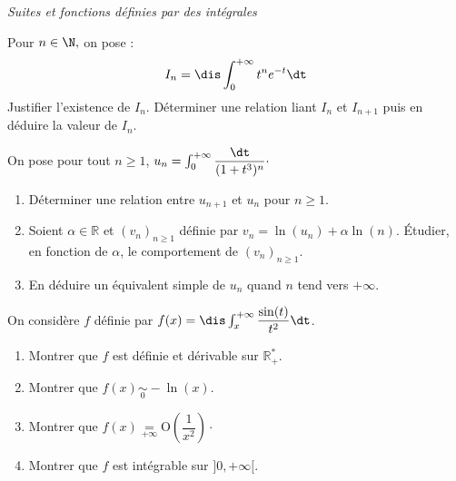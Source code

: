 \documentclass[a4paper,10pt]{report}
\begin{document}
\medskip

\begin{center}
\textit{{ {\large Suites et fonctions définies par des intégrales}}}
\end{center}

\medskip

\begin{Exercice}{} Pour $n\in\N,$ on pose :
$$I_n=\dis\int_0^{+\infty} t^ne^{-t} \dt$$
Justifier l'existence de $I_n$. D\'eterminer une relation liant $I_n$ et $I_{n+1}$ puis en d\'eduire la valeur de $I_n.$
\end{Exercice} 



\begin{Exercice}{} On pose pour tout $n \geq 1$, $u_n = \int_{0}^{+ \infty} \dfrac{\dt}{(1+t^3)^n} \cdot$
\begin{enumerate}
\item Déterminer une relation entre $u_{n+1}$ et $u_n$ pour $n \geq 1$.
\item Soient $\alpha \in \mathbb{R}$ et $(v_n)_{n \geq 1}$ définie par $v_n = \ln(u_n) + \alpha \ln(n)$. Étudier, en fonction de $\alpha$, le comportement de $(v_n)_{n \geq 1}$.
\item En déduire un équivalent simple de $u_n$ quand $n$ tend vers $+ \infty$.
\end{enumerate}
\end{Exercice} 



\begin{Exercice}{} On considère $f$ définie par $f(x)= \dis \int_x^{+ \infty} \dfrac{\sin(t)}{t^2} \dt$.
\begin{enumerate}
\item Montrer que $f$ est définie et dérivable sur $\mathbb{R}_+^{*}$.
\item Montrer que $f(x) \underset{0}{\sim} -\ln(x)$.
\item Montrer que $f(x) \underset{+ \infty}{=} \textrm{O} \left( \dfrac{1}{x^2} \right) \cdot$
\item Montrer que $f$ est intégrable sur $]0, + \infty[$.
\end{enumerate}
\end{Exercice}
\end{document}
